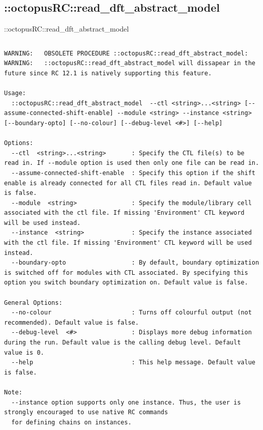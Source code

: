 \documentclass[handout]{beamer}
\begin{document}
\subsection{::octopusRC::read\_dft\_abstract\_model}
\begin{frame}{::octopusRC::read\_dft\_abstract\_model}
\begin{columns}
\begin{column}{1.1\textwidth}
	\tiny
	\begin{verbatim}
WARNING:   OBSOLETE PROCEDURE ::octopusRC::read_dft_abstract_model:
WARNING:   ::octopusRC::read_dft_abstract_model will dissapear in the future since RC 12.1 is natively supporting this feature.

Usage:
  ::octopusRC::read_dft_abstract_model  --ctl <string>...<string> [--assume-connected-shift-enable] --module <string> --instance <string> [--boundary-opto] [--no-colour] [--debug-level <#>] [--help]

Options:
  --ctl  <string>...<string>       : Specify the CTL file(s) to be read in. If --module option is used then only one file can be read in.
  --assume-connected-shift-enable  : Specify this option if the shift enable is already connected for all CTL files read in. Default value is false.
  --module  <string>               : Specify the module/library cell associated with the ctl file. If missing 'Environment' CTL keyword will be used instead.
  --instance  <string>             : Specify the instance associated with the ctl file. If missing 'Environment' CTL keyword will be used instead.
  --boundary-opto                  : By default, boundary optimization is switched off for modules with CTL associated. By specifying this option you switch boundary optimization on. Default value is false.

General Options:
  --no-colour                      : Turns off colourful output (not recommended). Default value is false.
  --debug-level  <#>               : Displays more debug information during the run. Default value is the calling debug level. Default value is 0.
  --help                           : This help message. Default value is false.

Note:
  --instance option supports only one instance. Thus, the user is strongly encouraged to use native RC commands
  for defining chains on instances. 
\end{verbatim}
  
\end{column}
\end{columns}
\end{frame}
\end{document}

